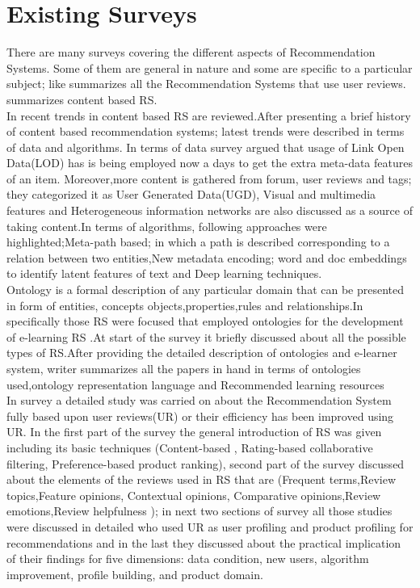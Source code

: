 \section{Existing Surveys}
There are many surveys covering the different aspects of Recommendation Systems. Some of them are general in nature and some are specific to a particular subject; like \cite{D7} summarizes all the Recommendation Systems that use user reviews.\cite{D5} summarizes content based RS.
\\In \cite{D5} recent trends in content based RS are reviewed.After presenting a brief history of content based recommendation systems; latest trends were described in terms of data and algorithms. In terms of data survey argued that usage of Link Open Data(LOD) has is being employed now a days to get the extra meta-data features of an item. Moreover,more content is gathered from forum, user reviews and tags; they categorized it as User Generated Data(UGD), Visual and multimedia features and Heterogeneous information networks are also discussed as a source of taking content.In terms of algorithms,
following approaches were highlighted;Meta-path based; in which a path is described corresponding to a relation between two entities,New metadata encoding; word and doc embeddings to identify latent features of text and Deep learning techniques.
\\
Ontology is a formal description of any particular domain that can be presented in form of entities, concepts objects,properties,rules and relationships.In \cite{D2} specifically those RS were focused that employed ontologies for the development of e-learning RS .At start of the survey it briefly discussed about all the possible types of RS.After providing the detailed description of ontologies and e-learner system, writer summarizes all the papers in hand in terms of ontologies used,ontology representation language and Recommended learning resources 
\\
In \cite{D7} survey a detailed study was carried on about the Recommendation System fully based upon user reviews(UR) or their efficiency has been improved using UR. In the first part of the survey the general introduction of RS was given including its basic techniques (Content-based , Rating-based collaborative filtering, Preference-based product ranking), second part of the survey discussed about the elements of the reviews used in RS that are (Frequent terms,Review topics,Feature opinions, Contextual opinions, Comparative opinions,Review emotions,Review helpfulness ); in next two sections of survey all those studies were discussed in detailed who used UR as user profiling and product profiling  for recommendations and in the last they discussed about the practical implication of their findings for five dimensions: data condition, new users, algorithm improvement, profile building, and product domain.
